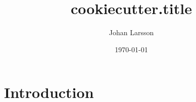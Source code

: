 \documentclass[english,a4paper]{article}
\title{{cookiecutter.title}}
\author{Johan Larsson}
\affil{The Department of Statistics, Lund University}
\date{\today}
\begin{document}
\maketitle


\section{Introduction}%
\label{introduction}

\end{document}
